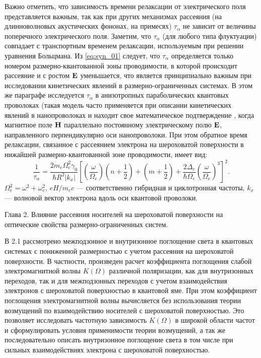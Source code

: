 Важно отметить, что зависимость времени релаксации от электрического поля представляется важным, так как при других механизмах рассеяния (на длинноволновых акустических фононах, на примесях) $\tau_\alpha$ не зависит от величины поперечного электрического поля. Заметим, что $\tau_\alpha$ (для любого типа флуктуации) совпадает с транспортным временем релаксации, используемым при решении уравнения Больцмана.
Из \eqref{eq:syn_01} следует, что $\tau_\alpha$ определяется только номером размерно-квантованной зоны проводимости, в которой происходит рассеяние и с ростом $\boldsymbol{\mathbf{E}}$ уменьшается, что является принципиально важным при исследовании кинетических явлений в размерно-ограниченных системах. В этом же параграфе исследуется $\tau_\alpha$ в анизотропных параболических квантовых проволоках (такая модель часто применяется при описании кинетических явлений в нанопроволоках \cite{Geiler1998,Geiler1999,Cros1992} и находит свое математическое подтверждение \cite{Beenakker1991}, когда магнитное поле $\boldsymbol{\mathbf{H}}$ параллельно постоянному электрическому полю $\boldsymbol{\mathbf{E}}$, направленного перпендикулярно оси нанопроволоки. При этом обратное время релаксации, связанное с рассеянием электрона на шероховатой поверхности в нижайшей размерно-квантованной зоне проводимости, имеет вид:
\begin{equation} \label{eq:syn_02}
\frac{1}{\tau_\alpha}=\frac{2m_e\Omega^2_e \gamma_0}{\hbar R^2 \left|k_x\right|} \left[\left(\frac{\omega}{\Omega_e}\right) \left(n+\frac{1}{2}\right)+ \left(m+\frac{1}{2}\right)+ \frac{2\Delta_c}{\hbar\Omega_e} \left(\frac{\omega}{\Omega_e}\right)^3\right]^2.
\end{equation}
$\Omega^2_e= \omega^2 + \omega_c^2$, $eH/m_e c$ --- соответственно гибридная и циклотронная частоты, $k_x$ --- волновой вектор электрона вдоль оси квантовой проволоки.

Глава 2. Влияние рассеяния носителей на шероховатой поверхности на оптические свойства размерно-ограниченных систем.

В 2.1 рассмотрено межподзонное и внутризонное поглощение света в квантовых системах с пониженной размерностью с учетом рассеяния на шероховатой поверхности. В частности, произведен расчет коэффициента поглощения слабой электромагнитной волны $K\left(\Omega \right)$ различной поляризации, как для внутризонных переходов, так и для межподзонных переходов с учетом взаимодействия электронов с шероховатой поверхностью в квантовой яме. При этом коэффициент поглощения электромагнитной волны вычисляется без использования теории возмущений по взаимодействию носителей с шероховатой поверхностью. Это позволяет исследовать частотную зависимость $K(\Omega)$ в широкой области частот и сформулировать условия применимости теории возмущений, а так же последовательно описать внутризонное поглощение света в том числе при сильных взаимодействиях электрона с шероховатой поверхностью.	

